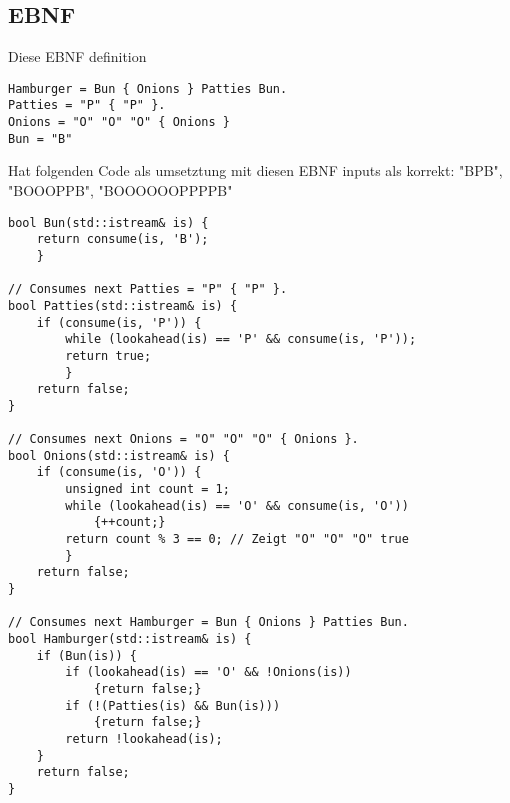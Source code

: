 \subsection{EBNF}
Diese EBNF definition
\begin{lstlisting}
Hamburger = Bun { Onions } Patties Bun.
Patties = "P" { "P" }.
Onions = "O" "O" "O" { Onions }
Bun = "B"
\end{lstlisting}
Hat folgenden Code als umsetztung mit diesen EBNF inputs als korrekt: "BPB", "BOOOPPB", "BOOOOOOPPPPB"
\begin{lstlisting}
bool Bun(std::istream& is) {
	return consume(is, 'B'); 
	}

// Consumes next Patties = "P" { "P" }.
bool Patties(std::istream& is) {
	if (consume(is, 'P')) {
		while (lookahead(is) == 'P' && consume(is, 'P'));
		return true;
		}
	return false;
}

// Consumes next Onions = "O" "O" "O" { Onions }.
bool Onions(std::istream& is) {
	if (consume(is, 'O')) {
		unsigned int count = 1;
		while (lookahead(is) == 'O' && consume(is, 'O'))
			{++count;}
		return count % 3 == 0; // Zeigt "O" "O" "O" true
		}
	return false;
}

// Consumes next Hamburger = Bun { Onions } Patties Bun.
bool Hamburger(std::istream& is) {
	if (Bun(is)) {
		if (lookahead(is) == 'O' && !Onions(is))
			{return false;}
		if (!(Patties(is) && Bun(is)))
			{return false;}
		return !lookahead(is);
	}
	return false;
}

\end{lstlisting}


